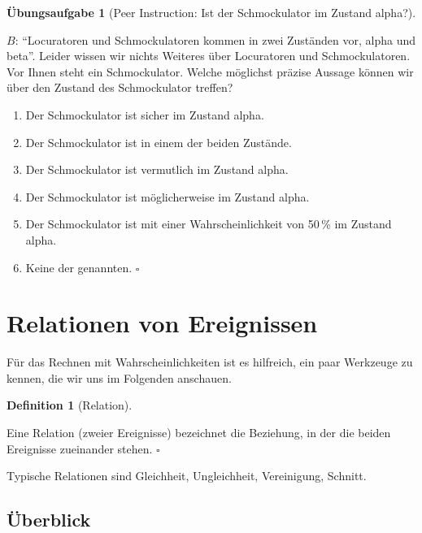\documentclass[
  ngerman,
  letterpaper,
  twoside,
  open=any]{scrbook}
\providecommand{\tightlist}{%
  \setlength{\itemsep}{0pt}\setlength{\parskip}{0pt}}\usepackage{longtable,booktabs,array}
\theoremstyle{definition}
\theoremstyle{plain}
\theoremstyle{definition}
\newtheorem{exercise}{Übungsaufgabe}[chapter]
\theoremstyle{definition}
\newtheorem{definition}{Definition}[chapter]
\theoremstyle{definition}
\theoremstyle{definition}
\newtheorem{exercise}{Übungsaufgabe}[chapter]
\theoremstyle{remark}
\begin{document}
\begin{exercise}[Peer Instruction: Ist der Schmockulator im Zustand
alpha?]\protect\hypertarget{exr-prob2}{}\label{exr-prob2}

\(B\): \enquote{Locuratoren und Schmockulatoren kommen in zwei Zuständen
vor, alpha und beta}. Leider wissen wir nichts Weiteres über Locuratoren
und Schmockulatoren. Vor Ihnen steht ein Schmockulator. Welche möglichst
präzise Aussage können wir über den Zustand des Schmockulator treffen?

\begin{enumerate}
\def\labelenumi{\Alph{enumi})}
\tightlist
\item
  Der Schmockulator ist sicher im Zustand alpha.
\item
  Der Schmockulator ist in einem der beiden Zustände.
\item
  Der Schmockulator ist vermutlich im Zustand alpha.
\item
  Der Schmockulator ist möglicherweise im Zustand alpha.
\item
  Der Schmockulator ist mit einer Wahrscheinlichkeit von 50\,\% im
  Zustand alpha.
\item
  Keine der genannten. \(\square\)
\end{enumerate}

\end{exercise}

\section{Relationen von Ereignissen}\label{relationen-von-ereignissen}

Für das Rechnen mit Wahrscheinlichkeiten ist es hilfreich, ein paar
Werkzeuge zu kennen, die wir uns im Folgenden anschauen.

\begin{definition}[Relation]\protect\hypertarget{def-relation}{}\label{def-relation}

Eine Relation (zweier Ereignisse) bezeichnet die Beziehung, in der die
beiden Ereignisse zueinander stehen. \(\square\)

\end{definition}

Typische Relationen sind Gleichheit, Ungleichheit, Vereinigung, Schnitt.

\subsection{Überblick}\label{uxfcberblick}
\end{document}
